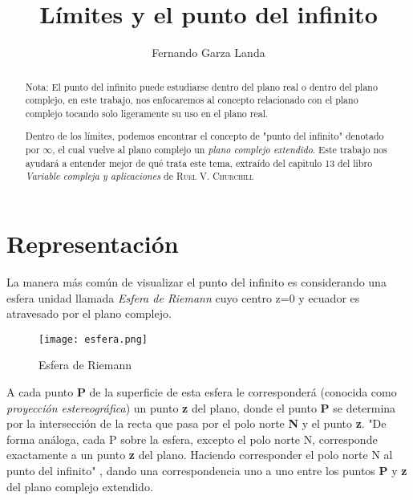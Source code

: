 \documentclass[12p]{article}
\begin{document}
\begin{titlepage}
\title{Límites y el punto del infinito}
\author{Fernando Garza Landa}
\maketitle
\vfill
\end{titlepage}

\begin{abstract}
Nota: El punto del infinito puede estudiarse dentro del plano real o dentro del plano complejo, en este trabajo, nos enfocaremos al concepto relacionado con el plano complejo tocando solo ligeramente su uso en el plano real.

Dentro de los límites, podemos encontrar el concepto de "punto del infinito" denotado por $\infty$, el cual vuelve al plano complejo un \textit{plano complejo extendido}. Este trabajo nos ayudará a entender mejor de qué trata este tema, extraído del capitulo 13 del libro \textit{Variable compleja y aplicaciones} de \textsc{Ruel V. Churchill}
\end{abstract}
\vspace{1cm}
\tableofcontents
\vspace{.5cm}
\listoffigures

\newpage

\section{Representación}
La manera más común de visualizar el punto del infinito es considerando una esfera unidad llamada \textit{Esfera de Riemann} cuyo centro z=0 y ecuador es atravesado por el plano complejo. 

\begin{figure}[h]
\begin{center}
\texttt{[image: esfera.png]}\\
\caption{Esfera de Riemann}
\label{fig:figura1}
\end{center}
\end{figure}

A cada punto \textbf{P} de la superficie de esta esfera le corresponderá (conocida como \textit{proyección estereográfica}) un punto \textbf{z} del plano, donde el punto \textbf{P} se determina por la intersección de la recta que pasa por el polo norte \textbf{N} y el punto \textbf{z}. "De forma análoga, cada P sobre la esfera, excepto el polo norte N, corresponde exactamente a un punto \textbf{z} del plano. Haciendo corresponder el polo norte N al punto del infinito" \cite{1}, dando una correspondencia uno a uno entre los puntos \textbf{P} y \textbf{z} del plano complejo extendido.
\end{document}
